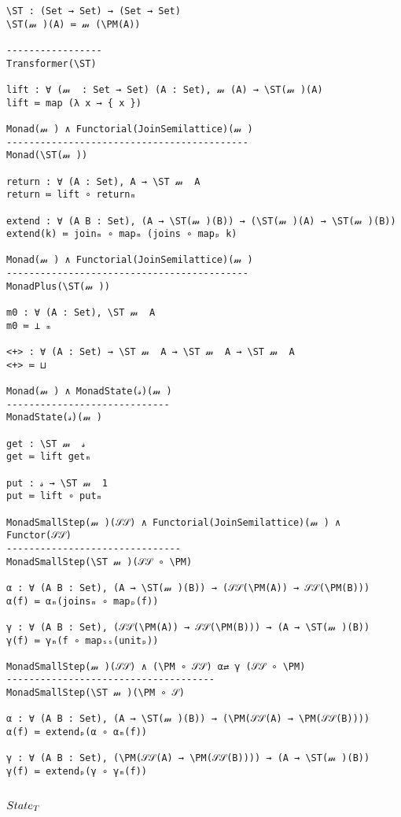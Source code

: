 \documentclass{article}
\begin{document}
\begin{verbatim}
\ST : (Set → Set) → (Set → Set)
\ST(𝓂 )(A) ≔ 𝓂 (\PM(A))

-----------------
Transformer(\ST)

lift : ∀ (𝓂  : Set → Set) (A : Set), 𝓂 (A) → \ST(𝓂 )(A)
lift ≔ map (λ x → { x })

Monad(𝓂 ) ∧ Functorial(JoinSemilattice)(𝓂 )
-------------------------------------------
Monad(\ST(𝓂 ))

return : ∀ (A : Set), A → \ST 𝓂  A
return ≔ lift ∘ returnₘ

extend : ∀ (A B : Set), (A → \ST(𝓂 )(B)) → (\ST(𝓂 )(A) → \ST(𝓂 )(B))
extend(k) ≔ joinₘ ∘ mapₘ (joins ∘ mapₚ k)

Monad(𝓂 ) ∧ Functorial(JoinSemilattice)(𝓂 )
-------------------------------------------
MonadPlus(\ST(𝓂 ))

m0 : ∀ (A : Set), \ST 𝓂  A
m0 ≔ ⊥ ₘ

<+> : ∀ (A : Set) → \ST 𝓂  A → \ST 𝓂  A → \ST 𝓂  A
<+> ≔ ⊔

Monad(𝓂 ) ∧ MonadState(𝓈)(𝓂 )
-----------------------------
MonadState(𝓈)(𝓂 )

get : \ST 𝓂  𝓈
get ≔ lift getₘ

put : 𝓈 → \ST 𝓂  1
put ≔ lift ∘ putₘ

MonadSmallStep(𝓂 )(𝒮𝒮) ∧ Functorial(JoinSemilattice)(𝓂 ) ∧ Functor(𝒮𝒮)
-------------------------------
MonadSmallStep(\ST 𝓂 )(𝒮𝒮 ∘ \PM)

α : ∀ (A B : Set), (A → \ST(𝓂 )(B)) → (𝒮𝒮(\PM(A)) → 𝒮𝒮(\PM(B)))
α(f) ≔ αₘ(joinsₘ ∘ mapₚ(f))

γ : ∀ (A B : Set), (𝒮𝒮(\PM(A)) → 𝒮𝒮(\PM(B))) → (A → \ST(𝓂 )(B))
γ(f) ≔ γₘ(f ∘ mapₛₛ(unitₚ))

MonadSmallStep(𝓂 )(𝒮𝒮) ∧ (\PM ∘ 𝒮𝒮) α⇄ γ (𝒮𝒮 ∘ \PM)
-------------------------------------
MonadSmallStep(\ST 𝓂 )(\PM ∘ 𝒮)

α : ∀ (A B : Set), (A → \ST(𝓂 )(B)) → (\PM(𝒮𝒮(A) → \PM(𝒮𝒮(B))))
α(f) ≔ extendₚ(α ∘ αₘ(f))

γ : ∀ (A B : Set), (\PM(𝒮𝒮(A) → \PM(𝒮𝒮(B)))) → (A → \ST(𝓂 )(B))
γ(f) ≔ extendₚ(γ ∘ γₘ(f))
\end{verbatim}



\subsection{$State_T$}
\label{section:Proofs+Definitions:StateT}
\end{document}
